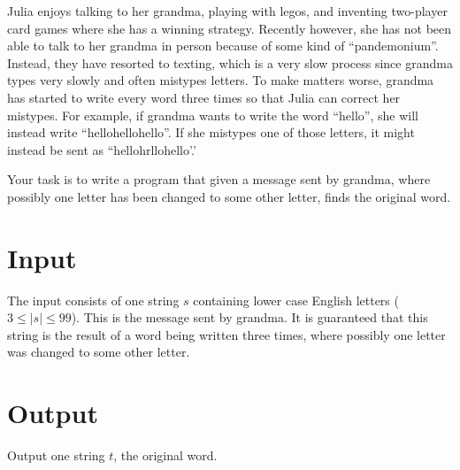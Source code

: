 
Julia enjoys talking to her grandma, playing with legos,
and inventing two-player card games where she has a winning
strategy. Recently however, she has not been able to talk to her
grandma in person because of some kind of ``pandemonium''. Instead,
they have resorted to texting, which is a very slow process since
grandma types very slowly and often mistypes letters. To make matters
worse, grandma has started to write every word three times so that
Julia can correct her mistypes. For example, if grandma wants to write
the word ``hello'', she will instead write ``hellohellohello''. If she
mistypes one of those letters, it might instead be sent as
``hellohrllohello'.'

Your task is to write a program that given a message sent by grandma,
where possibly one letter has been changed to some other letter, finds
the original word.

\section*{Input}
The input consists of one string $s$ containing lower case English letters ($3 \leq |s| \leq 99$). 
This is the message sent by grandma. It is guaranteed that this string is the result of a word being
written three times, where possibly one letter was changed to some other letter.


\section*{Output}
Output one string $t$, the original word.
